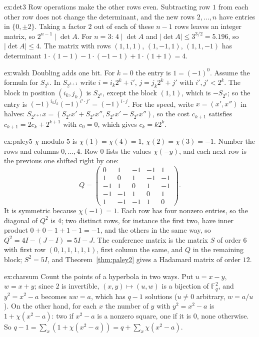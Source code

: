 \begin{solution}{ex:det3}
\idea Row operations make the other rows even.
\writeup Subtracting row $1$ from each other row does not change the determinant, and the new rows $2,\dots,n$ have entries in $\{0,\pm2\}$. Taking
a factor $2$ out of each of these $n-1$ rows leaves an integer matrix, so $2^{n-1}\mid\det A$. For $n=3$: $4\mid\det A$ and
$|\det A|\le3^{3/2}=5.196$, so $|\det A|\le4$. The matrix with rows $(1,1,1)$, $(1,-1,1)$, $(1,1,-1)$ has determinant
$1\cdot(1-1)-1\cdot(-1-1)+1\cdot(1+1)=4$.
\end{solution}

\begin{solution}{ex:walsh}
\idea Doubling adds one bit.
\writeup For $k=0$ the entry is $1=(-1)^0$. Assume the formula for $S_{2^k}$. In $S_{2^{k+1}}$ write $i=i_k2^k+i'$, $j=j_k2^k+j'$ with $i',j'<2^k$. The
block in position $(i_k,j_k)$ is $S_{2^k}$, except the block $(1,1)$, which is $-S_{2^k}$; so the entry is $(-1)^{i_kj_k}(-1)^{i'\cdot j'}=(-1)^{i\cdot j}$.
For the speed, write $x=(x',x'')$ in halves: $S_{2^{k+1}}x=(S_{2^k}x'+S_{2^k}x'',S_{2^k}x'-S_{2^k}x'')$, so the cost $c_{k+1}$ satisfies
$c_{k+1}=2c_k+2^{k+1}$ with $c_0=0$, which gives $c_k=k2^k$.
\end{solution}

\begin{solution}{ex:paley5}
\idea $\chi$ modulo $5$ is $\chi(1)=\chi(4)=1$, $\chi(2)=\chi(3)=-1$.
\writeup Number the rows and columns $0,\dots,4$. Row $0$ lists the values $\chi(-y)$, and each next row is the previous one shifted right by one:
\[
Q=\begin{pmatrix}0&1&-1&-1&1\\1&0&1&-1&-1\\-1&1&0&1&-1\\-1&-1&1&0&1\\1&-1&-1&1&0\end{pmatrix}.
\]
It is symmetric because $\chi(-1)=1$. Each row has four nonzero entries, so the diagonal of $Q^2$ is $4$; two distinct rows, for instance the first two, have inner product
$0+0-1+1-1=-1$, and the others in the same way, so $Q^2=4I-(J-I)=5I-J$. The conference matrix is the matrix $S$ of order $6$ with first row
$(0,1,1,1,1,1)$, first column the same, and $Q$ in the remaining block; $S^2=5I$, and Theorem~\ref{thm:paley2} gives a Hadamard matrix of order $12$.
\end{solution}

\begin{solution}{ex:charsum}
\idea Count the points of a hyperbola in two ways.
\writeup Put $u=x-y$, $w=x+y$; since $2$ is invertible, $(x,y)\mapsto(u,w)$ is a bijection of $\mathbb F_q^2$, and $y^2=x^2-a$ becomes $uw=a$, which has
$q-1$ solutions ($u\neq0$ arbitrary, $w=a/u$). On the other hand, for each $x$ the number of $y$ with $y^2=x^2-a$ is $1+\chi(x^2-a)$: two if $x^2-a$ is a
nonzero square, one if it is $0$, none otherwise. So $q-1=\sum_x(1+\chi(x^2-a))=q+\sum_x\chi(x^2-a)$.
\end{solution}

